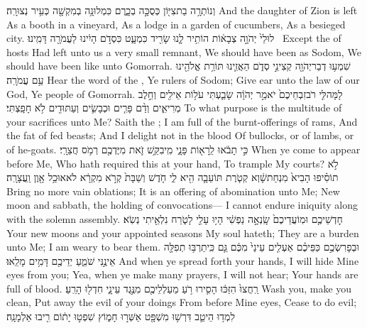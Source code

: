 {וְנוֹתְרָ֥ה בַת\maqqaf צִיּ֖וֹן כְּסֻכָּ֣ה בְכָ֑רֶם כִּמְלוּנָ֥ה בְמִקְשָׁ֖ה כְּעִ֥יר נְצוּרָֽה׃}
{And the daughter of Zion is left As a booth in a vineyard, As a lodge in a garden of cucumbers, As a besieged city.}
{לוּלֵי֙ יְהֹוָ֣ה צְבָא֔וֹת הוֹתִ֥יר לָ֛נוּ שָׂרִ֖יד כִּמְעָ֑ט כִּסְדֹ֣ם הָיִ֔ינוּ לַעֲמֹרָ֖ה דָּמִֽינוּ׃ \petucha }
{Except the \lord\space of hosts Had left unto us a very small remnant, We should have been as Sodom, We should have been like unto Gomorrah.}
{שִׁמְע֥וּ דְבַר\maqqaf יְהֹוָ֖ה קְצִינֵ֣י סְדֹ֑ם הַאֲזִ֛ינוּ תּוֹרַ֥ת אֱלֹהֵ֖ינוּ עַ֥ם עֲמֹרָֽה׃}
{Hear the word of the \lord, Ye rulers of Sodom; Give ear unto the law of our God, Ye people of Gomorrah.}
{לָמָּה\maqqaf לִּ֤י רֹב\maqqaf זִבְחֵיכֶם֙ יֹאמַ֣ר יְהֹוָ֔ה שָׂבַ֛עְתִּי עֹל֥וֹת אֵילִ֖ים וְחֵ֣לֶב מְרִיאִ֑ים וְדַ֨ם פָּרִ֧ים וּכְבָשִׂ֛ים וְעַתּוּדִ֖ים לֹ֥א חָפָֽצְתִּי׃}
{To what purpose is the multitude of your sacrifices unto Me? Saith the \lord; I am full of the burnt-offerings of rams, And the fat of fed beasts; And I delight not in the blood Of bullocks, or of lambs, or of he-goats.}
{כִּ֣י תָבֹ֔אוּ לֵֽרָא֖וֹת פָּנָ֑י מִֽי\maqqaf בִקֵּ֥שׁ זֹ֛את מִיֶּדְכֶ֖ם רְמֹ֥ס חֲצֵרָֽי׃}
{When ye come to appear before Me, Who hath required this at your hand, To trample My courts?}
{לֹ֣א תוֹסִ֗יפוּ הָבִיא֙ מִנְחַת\maqqaf שָׁ֔וְא קְטֹ֧רֶת תּוֹעֵבָ֛ה הִ֖יא לִ֑י חֹ֤דֶשׁ וְשַׁבָּת֙ קְרֹ֣א מִקְרָ֔א לֹא\maqqaf אוּכַ֥ל אָ֖וֶן וַֽעֲצָרָֽה׃}
{Bring no more vain oblations; It is an offering of abomination unto Me; New moon and sabbath, the holding of convocations— I cannot endure iniquity along with the solemn assembly.}
{חׇדְשֵׁיכֶ֤ם וּמֽוֹעֲדֵיכֶם֙ שָֽׂנְאָ֣ה נַפְשִׁ֔י הָי֥וּ עָלַ֖י לָטֹ֑רַח נִלְאֵ֖יתִי נְשֹֽׂא׃}
{Your new moons and your appointed seasons My soul hateth; They are a burden unto Me; I am weary to bear them.}
{וּבְפָרִשְׂכֶ֣ם כַּפֵּיכֶ֗ם אַעְלִ֤ים עֵינַי֙ מִכֶּ֔ם גַּ֛ם כִּֽי\maqqaf תַרְבּ֥וּ תְפִלָּ֖ה אֵינֶ֣נִּי שֹׁמֵ֑עַ יְדֵיכֶ֖ם דָּמִ֥ים מָלֵֽאוּ׃}
{And when ye spread forth your hands, I will hide Mine eyes from you; Yea, when ye make many prayers, I will not hear; Your hands are full of blood.}
{רַֽחֲצוּ֙ הִזַּכּ֔וּ הָסִ֛ירוּ רֹ֥עַ מַעַלְלֵיכֶ֖ם מִנֶּ֣גֶד עֵינָ֑י חִדְל֖וּ הָרֵֽעַ׃}
{Wash you, make you clean, Put away the evil of your doings From before Mine eyes, Cease to do evil;}
{לִמְד֥וּ הֵיטֵ֛ב דִּרְשׁ֥וּ מִשְׁפָּ֖ט אַשְּׁר֣וּ חָמ֑וֹץ שִׁפְט֣וּ יָת֔וֹם רִ֖יבוּ אַלְמָנָֽה׃ \setuma }
